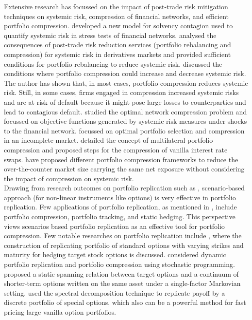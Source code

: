 \noindent Extensive research has focussed on the impact of post-trade risk mitigation techniques on systemic risk, compression of financial networks, and efficient portfolio compression. \cite{veraart2020distress} developed a new model for solvency contagion used to quantify systemic risk in stress tests of financial networks. \cite{veraart2021macroprudential} analysed the consequences of post-trade risk reduction services (portfolio rebalancing and compression) for systemic risk in derivatives markets and provided sufficient conditions for portfolio rebalancing to reduce systemic risk. \cite{veraart2022does} discussed the conditions where portfolio compression could increase and decrease systemic risk. The author has shown that, in most cases, portfolio compression reduces systemic risk. Still, in some cases, firms engaged in compression increased systemic risks and are at risk of default because it might pose large losses to counterparties and lead to contagious default. \cite{amini2022optimal} studied the optimal network compression problem and focussed on objective functions generated by systemic risk measures under shocks to the financial network. \cite{dokuchaev2001optimal} focussed on optimal portfolio selection and compression in an incomplete market. \cite{marquart2014note} detailed the concept of multilateral portfolio compression and proposed steps for the compression of vanilla interest rate swaps. \cite{d2021compressing} have proposed different portfolio compression frameworks to reduce the over-the-counter market size carrying the same net exposure without considering the impact of compression on systemic risk. \\

\noindent Drawing from research outcomes on portfolio replication such as \cite{dembo1999practice}, scenario-based approach (for non-linear instruments like options) is very effective in portfolio replication. Few applications of portfolio replication, as mentioned in \cite{dembo1999practice}, include portfolio compression, portfolio tracking, and static hedging. This perspective views scenarios based portfolio replication as an effective tool for portfolio compression. Few notable researches on portfolio replication include \cite{derman1995static}, where the construction of replicating portfolio of standard options with varying strikes and maturity for hedging target stock options is discussed. \cite{dempster2002dynamic} considered dynamic portfolio replication and portfolio compression using stochastic programming. \cite{carr2014static} proposed a static spanning relation between target options and a continuum of shorter-term options written on the same asset under a single-factor Markovian setting. \cite{bossu2021functional} used the spectral decomposition technique to replicate payoff by a discrete portfolio of special options, which also can be a powerful method for fast pricing large vanilla option portfolios. \\

